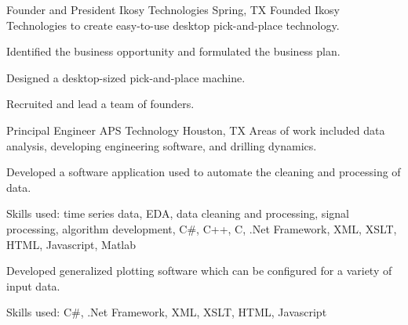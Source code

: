 \documentclass{leresume}
\begin{document}
    
            {Founder and President}
            {Ikosy Technologies}
			{Spring, TX}
			Founded Ikosy Technologies to create easy-to-use desktop pick-and-place technology.
		\begin{bulletedlist}
			
		\item
		
					Identified the business opportunity and formulated the business plan.
				
		\item
		
					Designed a desktop-sized pick-and-place machine.
				
		\item
		
					Recruited and lead a team of founders.
				
		\end{bulletedlist}
	
            {Principal Engineer}
            {APS Technology}
			{Houston, TX}
			Areas of work included data analysis, developing engineering software, and drilling dynamics.\nolinebreak[4]
		\begin{bulletedlist}
			
		\item
		
					Developed a software application used to automate the cleaning and processing of data.
				
		\begin{bulletedlist}
			
		\item
		
						Skills used: time series data, EDA, data cleaning and processing, signal processing, algorithm development, C\#, C++, C, .Net Framework, XML, XSLT, HTML, Javascript, Matlab
					
		\end{bulletedlist}
	
		\item
		
					Developed generalized plotting software which can be configured for a variety of input data.
				
		\begin{bulletedlist}
			
		\item
		
						Skills used: C\#, .Net Framework, XML, XSLT, HTML, Javascript
					
		\end{bulletedlist}
	
		\end{bulletedlist}
	
\end{document}
